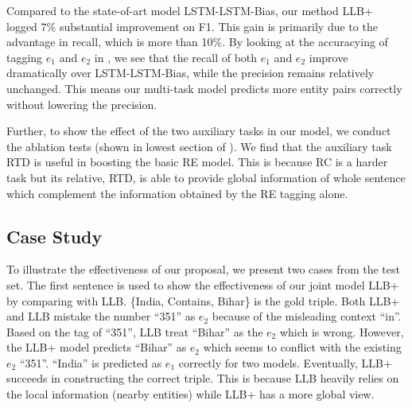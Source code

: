 Compared to the state-of-art model LSTM-LSTM-Bias, our method LLB+
logged 7\% substantial improvement on F1. This gain is primarily due to 
the advantage in recall, which is more than 10\%. 
By looking at the accuracying of tagging $e_1$ and $e_2$ in , 
we see that the recall of both $e_1$ and $e_2$ improve dramatically over 
LSTM-LSTM-Bias, while the precision remains relatively unchanged. 
This means our multi-task model predicts more entity pairs correctly
without lowering the precision.

Further, to show the effect of the two auxiliary tasks in our model, we conduct
the ablation tests (shown in lowest section of ). 
We find that the auxiliary task RTD is useful in boosting the basic RE model. 
This is because 
RC is a harder task but its relative, RTD, is able to  
provide global information of whole sentence which
complement the information obtained by the RE tagging alone. 

\subsection{Case Study}
To illustrate the effectiveness of our proposal, we present two cases
from the test set. The first sentence is used to show the effectiveness of our
joint model LLB+ by comparing with LLB. \{India, Contains, Bihar\} is the gold
triple. Both LLB+ and LLB mistake the number ``351'' as $e_2$ because
of the misleading context ``in''. Based on the tag of ``351'', LLB treat
``Bihar'' as the $e_2$ which is wrong. However, the LLB+ model 
predicts ``Bihar'' as $e_2$ which seems to conflict with the existing $e_2$ ``351''.
``India'' is predicted as $e_1$ correctly for two models. Eventually, 
LLB+ succeeds in constructing the correct triple. 
This is because LLB heavily relies on the local information (nearby entities) 
while LLB+ has a more global view.

